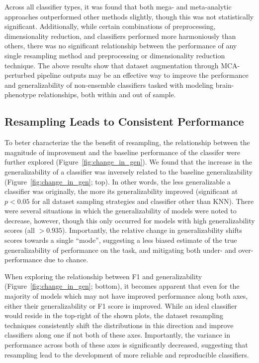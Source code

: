 \documentclass[10pt]{SelfArx} %
\begin{document}
Across all classifier types, it was found that both mega- and meta-analytic approaches outperformed other methods
slightly, though this was not statistically significant. Additionally, while certain combinations of preprocessing,
dimensionality reduction, and classifiers performed more harmoniously than others, there was no significant
relationship between the performance of any single resampling method and preprocessing or dimensionality reduction
technique. The above results show that dataset augmentation through MCA-perturbed pipeline outputs may be an effective
way to improve the performance and generalizability of non-ensemble classifiers tasked with modeling brain-phenotype
relationships, both within and out of sample.

\subsection*{Resampling Leads to Consistent Performance}

To beter characterize the the benefit of resampling, the relationship between the magnitude of improvement and the
baseline performance of the classifer were further explored (Figure~\ref{fig:change_in_gen}). We found that the
increase in the generalizability of a classifier was inversely related to the baseline generalizability
(Figure~\ref{fig:change_in_gen}; top). In other words, the less generalizable a classifier was originally, the more its
generalizability improved (significant at $p < 0.05$ for all dataset sampling strategies and classifier other than
KNN). There were several situations in which the generalizability of models were noted to decrease, however, though
this only occurred for models with high generalizability scores (all $>0.935$). Importantly, the relative change in
generalizability shifts scores towards a single ``mode'', suggesting a less biased estimate of the true
generalizability of performance on the task, and mitigating both under- and over-performance due to chance.

When exploring the relationship between F1 and generalizability (Figure~\ref{fig:change_in_gen}; bottom), it becomes
apparent that even for the majority of models which may not have improved performance along both axes, either their
generalizability or F1 score is improved. While an ideal classifier would reside in the top-right of the shown plots,
the dataset resampling techniques consistently shift the distributions in this direction and improve classifiers along
one if not both of these axes. Importantly, the variance in performance across both of these axes is significantly
decreased, suggesting that resampling lead to the development of more reliable and reproducible classifiers.
\end{document}

